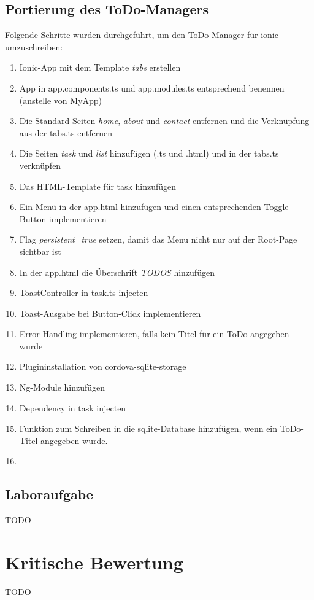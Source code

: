 \documentclass[german]{lni}
\begin{document}
\subsection{Portierung des ToDo-Managers}
Folgende Schritte wurden durchgeführt, um den ToDo-Manager für ionic umzuschreiben:
\begin{enumerate}
	\item Ionic-App mit dem Template \emph{tabs} erstellen
	\item App in app.components.ts und app.modules.ts entsprechend benennen (anstelle von MyApp)
	\item Die Standard-Seiten \emph{home}, \emph{about} und \emph{contact} entfernen und die Verknüpfung aus der tabs.ts entfernen
	\item Die Seiten \emph{task} und \emph{list} hinzufügen (.ts und .html) und in der tabs.ts verknüpfen
	\item Das HTML-Template für task hinzufügen
	\item Ein Menü in der app.html hinzufügen und einen entsprechenden Toggle-Button implementieren
	\item Flag \emph{persistent=true} setzen, damit das Menu nicht nur auf der Root-Page sichtbar ist
	\item In der app.html die Überschrift \emph{TODOS} hinzufügen
	\item ToastController in task.ts injecten
	\item Toast-Ausgabe bei Button-Click implementieren
	\item Error-Handling implementieren, falls kein Titel für ein ToDo angegeben wurde
	\item Plugininstallation von cordova-sqlite-storage	
	\item Ng-Module hinzufügen
	\item Dependency in task injecten
	\item Funktion zum Schreiben in die sqlite-Database hinzufügen, wenn ein ToDo-Titel angegeben wurde.
	\item 
\end{enumerate}

\subsection{Laboraufgabe}
TODO
\section{Kritische Bewertung}
TODO

%
\end{document}
